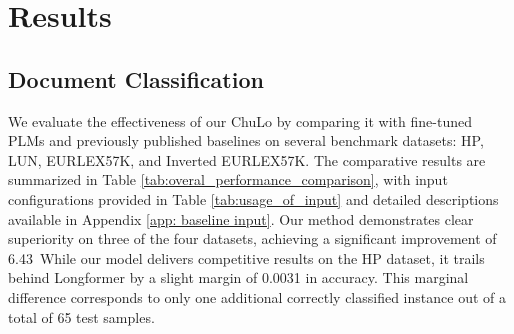 \documentclass[11pt]{article}
\begin{document}
\section{Results}
\subsection{Document Classification}
We evaluate the effectiveness of our ChuLo by comparing it with fine-tuned PLMs and previously published baselines \citep{park2022efficient, jaiswal2023breaking} on several benchmark datasets: HP, LUN, EURLEX57K, and Inverted EURLEX57K. The comparative results are summarized in Table \ref{tab:overal_performance_comparison}, with input configurations provided in Table \ref{tab:usage_of_input} and detailed descriptions available in Appendix \ref{app: baseline input}. 
Our method demonstrates clear superiority on three of the four datasets, achieving a significant improvement of 6.43\
While our model delivers competitive results on the HP dataset, it trails behind Longformer by a slight margin of 0.0031 in accuracy. This marginal difference corresponds to only one additional correctly classified instance out of a total of 65 test samples. 
\end{document}
